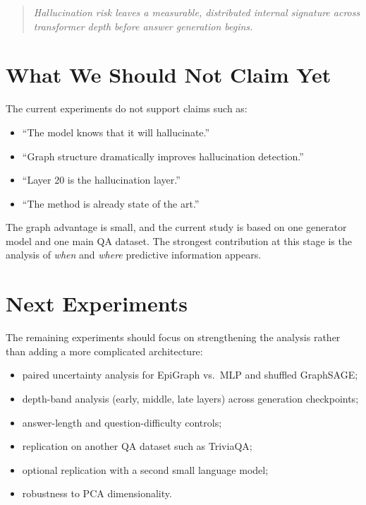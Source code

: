 \documentclass[11pt]{article}
\begin{document}
\begin{quote}
\textit{Hallucination risk leaves a measurable, distributed internal signature across transformer depth before answer generation begins.}
\end{quote}

\section{What We Should Not Claim Yet}

The current experiments do not support claims such as:

\begin{itemize}[leftmargin=1.5em]
    \item ``The model knows that it will hallucinate.''
    \item ``Graph structure dramatically improves hallucination detection.''
    \item ``Layer 20 is the hallucination layer.''
    \item ``The method is already state of the art.''
\end{itemize}

The graph advantage is small, and the current study is based on one generator model and one main QA dataset. The strongest contribution at this stage is the analysis of \textit{when} and \textit{where} predictive information appears.

\section{Next Experiments}

The remaining experiments should focus on strengthening the analysis rather than adding a more complicated architecture:

\begin{itemize}[leftmargin=1.5em]
    \item paired uncertainty analysis for EpiGraph vs.\ MLP and shuffled GraphSAGE;
    \item depth-band analysis (early, middle, late layers) across generation checkpoints;
    \item answer-length and question-difficulty controls;
    \item replication on another QA dataset such as TriviaQA;
    \item optional replication with a second small language model;
    \item robustness to PCA dimensionality.
\end{itemize}
\end{document}
